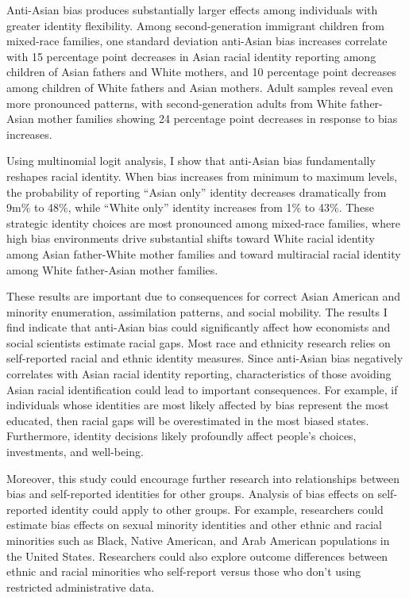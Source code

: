 Anti-Asian bias produces substantially larger effects among individuals with greater identity flexibility. Among second-generation immigrant children from mixed-race families, one standard deviation anti-Asian bias increases correlate with 15 percentage point decreases in Asian racial identity reporting among children of Asian fathers and White mothers, and 10 percentage point decreases among children of White fathers and Asian mothers. Adult samples reveal even more pronounced patterns, with second-generation adults from White father-Asian mother families showing 24 percentage point decreases in response to bias increases.

Using multinomial logit analysis, I show that anti-Asian bias fundamentally reshapes racial identity. When bias increases from minimum to maximum levels, the probability of reporting ``Asian only'' identity decreases dramatically from 9m\% to 48\%, while ``White only'' identity increases from 1\% to 43\%. These strategic identity choices are most pronounced among mixed-race families, where high bias environments drive substantial shifts toward White racial identity among Asian father-White mother families and toward multiracial racial identity among White father-Asian mother families.

These results are important due to consequences for correct Asian American and minority enumeration, assimilation patterns, and social mobility. The results I find indicate that anti-Asian bias could significantly affect how economists and social scientists estimate racial gaps. Most race and ethnicity research relies on self-reported racial and ethnic identity measures. Since anti-Asian bias negatively correlates with Asian racial identity reporting, characteristics of those avoiding Asian racial identification could lead to important consequences. For example, if individuals whose identities are most likely affected by bias represent the most educated, then racial gaps will be overestimated in the most biased states. Furthermore, identity decisions likely profoundly affect people's choices, investments, and well-being.

Moreover, this study could encourage further research into relationships between bias and self-reported identities for other groups. Analysis of bias effects on self-reported identity could apply to other groups. For example, researchers could estimate bias effects on sexual minority identities and other ethnic and racial minorities such as Black, Native American, and Arab American populations in the United States. Researchers could also explore outcome differences between ethnic and racial minorities who self-report versus those who don't using restricted administrative data.

